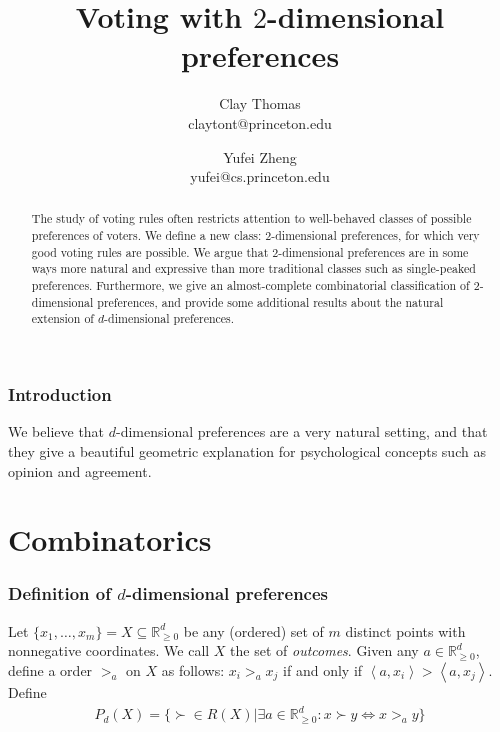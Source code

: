 \documentclass[12pt]{article}
\newcommand{\Rgz}{\mathbb{R}_{\ge 0}}
\newcommand{\ip}[2]{\left\langle{#1},{#2}\right\rangle}
\newcommand{\1}[1]{\mathds{1}[{#1}]}
\begin{document}
 
\title{Voting with $2$-dimensional preferences}
\author{
  Clay Thomas \\
  claytont@princeton.edu
\and
  Yufei Zheng\\
  yufei@cs.princeton.edu
}

\maketitle
\begin{abstract}
  The study of voting rules often restricts attention to
  well-behaved classes of possible preferences of voters.
  We define a new class: $2$-dimensional preferences,
  for which very good voting rules are possible.
  We argue that $2$-dimensional preferences are in some ways
  more natural and expressive than more traditional classes
  such as single-peaked preferences.
  Furthermore, we give an almost-complete combinatorial classification
  of $2$-dimensional preferences, and provide some additional
  results about the natural extension of $d$-dimensional preferences.
\end{abstract}

\section{Introduction}

  We believe that $d$-dimensional preferences are a very natural setting,
  and that they give a beautiful geometric explanation for psychological
  concepts such as opinion and agreement. 



\clearpage
\part{Combinatorics}

\section{Definition of $d$-dimensional preferences}
  Let $\{x_1,\ldots,x_m\} = X\subseteq \Rgz^d$ be any (ordered) set of
  $m$ distinct points with nonnegative coordinates.
  We call $X$ the set of \emph{outcomes}.
  Given any $a\in \Rgz^d$, define a order $>_a$ on $X$ as follows:
  $x_i >_a x_j$ if and only if $\ip{a}{x_i} > \ip{a}{x_j}$.
  Define
  \begin{align*}
    P_d(X) = \{ \succ \in R(X) | \exists a\in\Rgz^d: x \succ y \iff x >_a y\}
  \end{align*}
\end{document}
